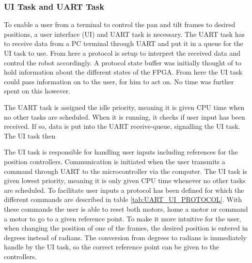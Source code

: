 \documentclass[../../main.tex]{subfiles}
\begin{document}





\subsubsection*{UI Task and UART Task}

To enable a user from a terminal to control the pan and tilt frames to desired positions, a user interface (UI) and UART task is necessary. The UART task has to receive data from a PC terminal through UART and put it in a queue for the UI task to use. From here a protocol is setup to interpret the received data and control the robot accordingly. A protocol state buffer was initially thought of to hold information about the different states of the FPGA. From here the UI task could pass information on to the user, for him to act on. No time was further spent on this however.

The UART task is assigned the idle priority, meaning it is given CPU time when no other tasks are scheduled. When it is running, it checks if user input has been received. If so, data is put into the UART receive-queue, signalling the UI task. The UI task then



The UI task is responsible for handling user inputs including references for the position controllers. Communication is initiated when the user transmits a command through UART to the microcontroller via the computer. The UI task is given lowest priority, meaning it is only given CPU time whenever no other tasks are scheduled. To facilitate user inputs a protocol has been defined for which the different commands are described in table \ref{tab:UART_UI_PROTOCOL}. With these commands the user is able to reset both motors, home a motor or command a motor to go to a given  reference point. 
To make it more intuitive for the user, when changing the position of one of the frames, the desired position is entered in degrees instead of radians. The conversion from degrees to radians is immediately handle by the UI task, so the correct reference point can be given to the controllers.  
\end{document}
